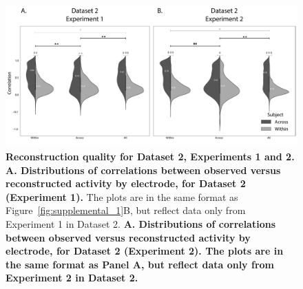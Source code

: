 \documentclass[10pt]{article}
\begin{document}
\begin{figure}[p]
\centering
\includegraphics[width=\textwidth]{figs/supplemental_2}
\caption{\textbf{Reconstruction quality for Dataset 2, Experiments 1
    and 2.}  \textbf{A. Distributions of correlations between observed
    versus reconstructed activity by electrode, for Dataset 2
    (Experiment 1).}  The plots are in the same format as
  Figure~\ref{fig:supplemental_1}B, but reflect data only from
  Experiment 1 in Dataset 2.  \textbf{A. Distributions of correlations between observed
    versus reconstructed activity by electrode, for Dataset 2
    (Experiment 2).  The plots are in the same format as Panel A, but
    reflect data only from Experiment 2 in Dataset 2.}}
%

\end{figure}
\end{document}
